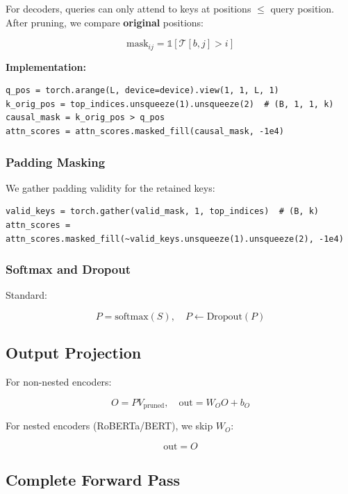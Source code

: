 For decoders, queries can only attend to keys at positions $\leq$ query 
position. After pruning, we compare \textbf{original} positions:

\[
\text{mask}_{ij} = \mathbb{1}[\mathcal{T}[b, j] > i]
\tag{4.5}
\]

\textbf{Implementation:}

\begin{lstlisting}
q_pos = torch.arange(L, device=device).view(1, 1, L, 1)
k_orig_pos = top_indices.unsqueeze(1).unsqueeze(2)  # (B, 1, 1, k)
causal_mask = k_orig_pos > q_pos
attn_scores = attn_scores.masked_fill(causal_mask, -1e4)
\end{lstlisting}

\subsubsection{Padding Masking}

We gather padding validity for the retained keys:

\begin{lstlisting}
valid_keys = torch.gather(valid_mask, 1, top_indices)  # (B, k)
attn_scores = attn_scores.masked_fill(~valid_keys.unsqueeze(1).unsqueeze(2), -1e4)
\end{lstlisting}

\subsubsection{Softmax and Dropout}

Standard:

\[
P = \text{softmax}(S), \quad P \leftarrow \text{Dropout}(P)
\tag{4.6}
\]

\subsection{Output Projection}

For non-nested encoders:

\[
O = P V_\text{pruned}, \quad \text{out} = W_O O + b_O
\tag{4.7}
\]

For nested encoders (RoBERTa/BERT), we skip $W_O$:

\[
\text{out} = O
\tag{4.8}
\]

\subsection{Complete Forward Pass}


